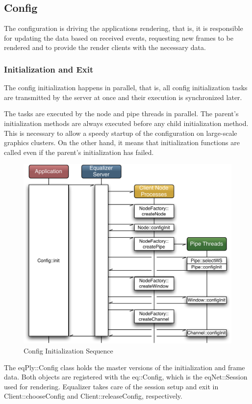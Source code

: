 \documentclass[10pt,a4]{scrartcl}
\begin{document}
\subsection{Config}

The configuration is driving the applications rendering, that is, it is
responsible for updating the data based on received events, requesting
new frames to be rendered and to provide the render clients with the
necessary data.

\subsubsection{Initialization and Exit}

The config initialization happens in parallel, that is, all config
initialization tasks are transmitted by the server at once and their
execution is synchronized later. 

The tasks are executed by the node and pipe threads in parallel. The
parent's initialization methods are always executed before any child
initialization method. This is necessary to allow a speedy startup of
the configuration on large-scale graphics clusters. On the other hand,
it means that initialization functions are called even if the parent's
initialization has failed.

\begin{figure}
  \includegraphics[width=.6\textwidth]{images/configInit.pdf}
  {\caption{\small\label{fConfigInit}Config Initialization Sequence}}
\end{figure}
The \textsf{eqPly::Config} class holds the master versions of the
initialization and frame data. Both objects are registered with the
\textsf{eq::Config}, which is the \textsf{eqNet::Session} used for
rendering. Equalizer takes care of the session setup and exit in
\textsf{Client::choose\-Config} and \textsf{Client::releaseConfig},
respectively.
\end{document}
